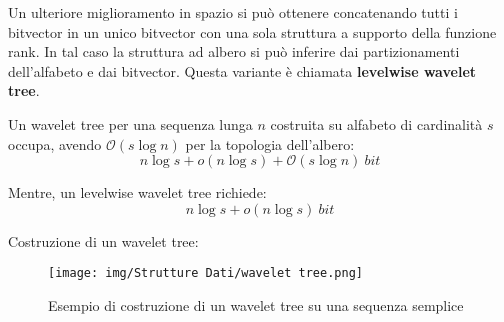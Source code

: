 Un ulteriore miglioramento in spazio si può ottenere concatenando tutti i bitvector
in un unico bitvector con una sola struttura a supporto della funzione rank. In
tal caso la struttura ad albero si può inferire dai partizionamenti dell'alfabeto e
dai bitvector. Questa variante è chiamata \textbf{levelwise wavelet tree}.

Un wavelet tree per una sequenza lunga $n$ costruita su alfabeto di cardinalità
$s$ occupa, avendo $\mathcal{O}(s \log n)$ per la topologia dell'albero:
\begin{equation}
    n \log s + o(n \log s) + \mathcal{O}(s \log n) \ bit
\end{equation}

Mentre, un levelwise wavelet tree richiede:
\begin{equation}
    n \log s + o(n \log s) \ bit
\end{equation}
\begin{esempio}
    Costruzione di un wavelet tree:
    \begin{figure}[!ht]
        \centering
        \texttt{[image: img/Strutture Dati/wavelet tree.png]}
        \caption{Esempio di costruzione di un wavelet tree su una sequenza semplice}
    \end{figure}
\end{esempio}
